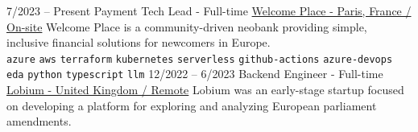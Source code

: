 \vspace{0.2cm}


\begin{entrylist}
    \entry
    {7/2023 -- Present}
    {Payment Tech Lead - Full-time}
    {
        \href{https://www.linkedin.com/company/welcome-place/}{Welcome Place - Paris, France / On-site}}
    {
        Welcome Place is a community-driven neobank providing simple, inclusive financial solutions for newcomers in Europe. \\

        \texttt{azure}\slashsep
        \texttt{aws}\slashsep
        \texttt{terraform}\slashsep
        \texttt{kubernetes}\slashsep
        \texttt{serverless}\slashsep
        \texttt{github-actions}\slashsep
        \texttt{azure-devops}\slashsep
        \texttt{eda}\slashsep
        \texttt{python}\slashsep
        \texttt{typescript}\slashsep
        \texttt{llm}\slashsep
    }
    \entry
    {12/2022 -- 6/2023}
    {Backend Engineer - Full-time}
    {
        \href{https://www.linkedin.com/company/lobium/}{Lobium - United Kingdom / Remote}}
    {
        Lobium was an early-stage startup focused on developing a platform for exploring and analyzing European parliament amendments. \\
}
\end{entrylist}
